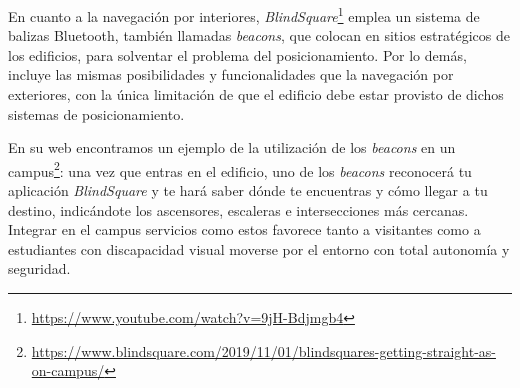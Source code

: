 En cuanto a la navegación por interiores, \textit{BlindSquare}\footnote{\url{https://www.youtube.com/watch?v=9jH-Bdjmgb4}} emplea un sistema de balizas Bluetooth, también llamadas \textit{beacons}, que colocan en sitios estratégicos de los edificios, para solventar el problema del posicionamiento. Por lo demás, incluye las mismas posibilidades y funcionalidades que la navegación por exteriores, con la única limitación de que el edificio debe estar provisto de dichos sistemas de posicionamiento.

En su web encontramos un ejemplo de la utilización de los \textit{beacons} en un campus\footnote{\url{https://www.blindsquare.com/2019/11/01/blindsquares-getting-straight-as-on-campus/}}: una vez que entras en el edificio, uno de los \textit{beacons} reconocerá tu aplicación \textit{BlindSquare} y te hará saber dónde te encuentras y cómo llegar a tu destino, indicándote los ascensores, escaleras e intersecciones más cercanas. Integrar en el campus servicios como estos favorece tanto a visitantes como a estudiantes con discapacidad visual moverse por el entorno con total autonomía y seguridad.

